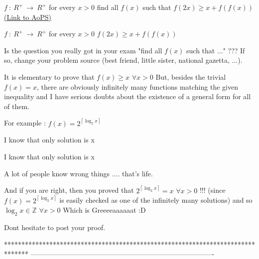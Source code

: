 \begin{problem}
	$f\ :\ R^{+}\ \rightarrow\ R^{+}$
for every $x > 0$
find all $f(x)$ such that 
$f(2x)\geq x + f(f(x))$
	\flushright \href{https://artofproblemsolving.com/community/c6h1635326}{(Link to AoPS)}
\end{problem}



\begin{solution}
	\begin{tcolorbox}$f\ :\ R^{+}\ \rightarrow\ R^{+}$
for every $x > 0$
$f(2x)\geq x + f(f(x))$\end{tcolorbox}
Is the question you really got in your exam "find all $f(x)$ such that ..." ???
If so, change your problem source (best friend, little sister, national gazetta, ...).

It is elementary to prove that $f(x)\ge x$ $\forall x>0$
But, besides the trivial $f(x)=x$, there are obviously infinitely many functions matching the given inequality and I have serious doubts about the existence of a general form for all of them.

For example : $f(x)=2^{\left\lceil\log_2 x\right\rceil}$



\end{solution}



\begin{solution}
	I know that only solution is x
\end{solution}



\begin{solution}
	\begin{tcolorbox}I know that only solution is x\end{tcolorbox}
A lot of people know wrong things .... that's life.

And if you are right, then you proved that $2^{\left\lceil\log_2 x\right\rceil}=x$ $\forall x>0$ !!! (since $f(x)=2^{\left\lceil\log_2 x\right\rceil}$ is easily checked as one of the infinitely many solutions) and so $\log_2 x\in\mathbb Z$ $\forall x>0$
Which is Greeeeaaaaaat   :D 

Dont hesitate to post your proof.

\end{solution}
*******************************************************************************
-------------------------------------------------------------------------------

